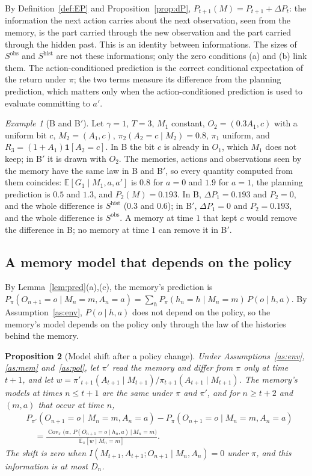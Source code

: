 \documentclass{article}
\newtheorem{proposition}{Proposition}[section]
\theoremstyle{definition}
\theoremstyle{remark}
\newtheorem{example}[proposition]{Example}
\newcommand{\E}{\mathbb{E}}
\newcommand{\dP}{\Delta P}
\begin{document}
By Definition~\ref{def:EP} and Proposition~\ref{prop:dP}, $P_{t+1}(M)=P_{t+1}+\dP_t$: the information the next action carries about the next observation, seen from the memory, is the part carried through the new observation and the part carried through the hidden past. This is an identity between informations. The sizes of $S^{\mathrm{obs}}$ and $S^{\mathrm{hist}}$ are not these informations; only the zero conditions (a) and (b) link them. The action-conditioned prediction is the correct conditional expectation of the return under $\pi$; the two terms measure its difference from the planning prediction, which matters only when the action-conditioned prediction is used to evaluate committing to $a'$.

\begin{example}[B and B$'$]
Let $\gamma=1$, $T=3$, $M_1$ constant, $O_2=(0.3A_1,c)$ with a uniform bit $c$, $M_2=(A_1,c)$, $\pi_2(A_2=c\mid M_2)=0.8$, $\pi_1$ uniform, and $R_3=(1+A_1)\mathbf 1[A_2=c]$. In B the bit $c$ is already in $O_1$, which $M_1$ does not keep; in B$'$ it is drawn with $O_2$. The memories, actions and observations seen by the memory have the same law in B and B$'$, so every quantity computed from them coincides: $\E[G_1\mid M_1,a,a']$ is $0.8$ for $a=0$ and $1.9$ for $a=1$, the planning prediction is $0.5$ and $1.3$, and $P_2(M)=0.193$. In B, $\dP_1=0.193$ and $P_2=0$, and the whole difference is $S^{\mathrm{hist}}$ ($0.3$ and $0.6$); in B$'$, $\dP_1=0$ and $P_2=0.193$, and the whole difference is $S^{\mathrm{obs}}$. A memory at time $1$ that kept $c$ would remove the difference in B; no memory at time $1$ can remove it in B$'$.
\end{example}

\subsection{A memory model that depends on the policy}

By Lemma~\ref{lem:pred}(a),(c), the memory's prediction is $P_\pi(O_{n+1}=o\mid M_n=m,A_n=a)=\sum_hP_\pi(h_n=h\mid M_n=m)\,P(o\mid h,a)$. By Assumption~\ref{as:env}, $P(o\mid h,a)$ does not depend on the policy, so the memory's model depends on the policy only through the law of the histories behind the memory.

\begin{proposition}[Model shift after a policy change]\label{prop:shift}
Under Assumptions~\ref{as:env}, \ref{as:mem} and~\ref{as:pol}, let $\pi'$ read the memory and differ from $\pi$ only at time $t+1$, and let $w=\pi'_{t+1}(A_{t+1}\mid M_{t+1})/\pi_{t+1}(A_{t+1}\mid M_{t+1})$. The memory's models at times $n\le t+1$ are the same under $\pi$ and $\pi'$, and for $n\ge t+2$ and $(m,a)$ that occur at time $n$,
\begin{align*}
&P_{\pi'}(O_{n+1}=o\mid M_n=m,A_n=a)-P_\pi(O_{n+1}=o\mid M_n=m,A_n=a)\\
&\quad=\frac{\operatorname{Cov}_\pi\big(w,\,P(O_{n+1}=o\mid h_n,a)\,\big|\,M_n=m\big)}{\E_\pi[w\mid M_n=m]}.
\end{align*}
The shift is zero when $I(M_{t+1},A_{t+1};O_{n+1}\mid M_n,A_n)=0$ under $\pi$, and this information is at most $D_n$.
\end{proposition}
\end{document}
